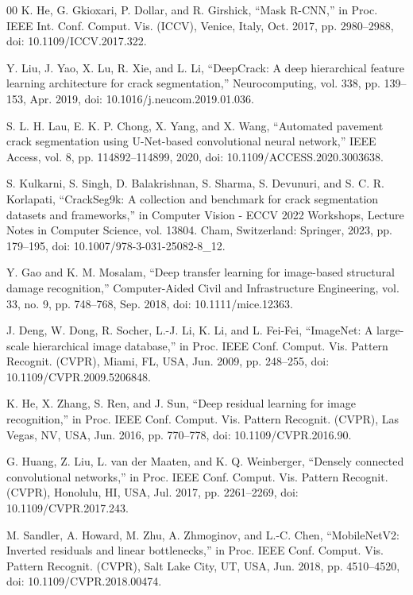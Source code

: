 \documentclass[conference]{IEEEtran}
\begin{document}
\begin{thebibliography}{00}
 K. He, G. Gkioxari, P. Dollar, and R. Girshick, ``Mask R-CNN,'' in Proc. IEEE Int. Conf. Comput. Vis. (ICCV), Venice, Italy, Oct. 2017, pp. 2980--2988, doi: 10.1109/ICCV.2017.322.

 Y. Liu, J. Yao, X. Lu, R. Xie, and L. Li, ``DeepCrack: A deep hierarchical feature learning architecture for crack segmentation,'' Neurocomputing, vol. 338, pp. 139--153, Apr. 2019, doi: 10.1016/j.neucom.2019.01.036.

 S. L. H. Lau, E. K. P. Chong, X. Yang, and X. Wang, ``Automated pavement crack segmentation using U-Net-based convolutional neural network,'' IEEE Access, vol. 8, pp. 114892--114899, 2020, doi: 10.1109/ACCESS.2020.3003638.

 S. Kulkarni, S. Singh, D. Balakrishnan, S. Sharma, S. Devunuri, and S. C. R. Korlapati, ``CrackSeg9k: A collection and benchmark for crack segmentation datasets and frameworks,'' in Computer Vision - ECCV 2022 Workshops, Lecture Notes in Computer Science, vol. 13804. Cham, Switzerland: Springer, 2023, pp. 179--195, doi: 10.1007/978-3-031-25082-8_12.

 Y. Gao and K. M. Mosalam, ``Deep transfer learning for image-based structural damage recognition,'' Computer-Aided Civil and Infrastructure Engineering, vol. 33, no. 9, pp. 748--768, Sep. 2018, doi: 10.1111/mice.12363.

 J. Deng, W. Dong, R. Socher, L.-J. Li, K. Li, and L. Fei-Fei, ``ImageNet: A large-scale hierarchical image database,'' in Proc. IEEE Conf. Comput. Vis. Pattern Recognit. (CVPR), Miami, FL, USA, Jun. 2009, pp. 248--255, doi: 10.1109/CVPR.2009.5206848.

 K. He, X. Zhang, S. Ren, and J. Sun, ``Deep residual learning for image recognition,'' in Proc. IEEE Conf. Comput. Vis. Pattern Recognit. (CVPR), Las Vegas, NV, USA, Jun. 2016, pp. 770--778, doi: 10.1109/CVPR.2016.90.

 G. Huang, Z. Liu, L. van der Maaten, and K. Q. Weinberger, ``Densely connected convolutional networks,'' in Proc. IEEE Conf. Comput. Vis. Pattern Recognit. (CVPR), Honolulu, HI, USA, Jul. 2017, pp. 2261--2269, doi: 10.1109/CVPR.2017.243.

 M. Sandler, A. Howard, M. Zhu, A. Zhmoginov, and L.-C. Chen, ``MobileNetV2: Inverted residuals and linear bottlenecks,'' in Proc. IEEE Conf. Comput. Vis. Pattern Recognit. (CVPR), Salt Lake City, UT, USA, Jun. 2018, pp. 4510--4520, doi: 10.1109/CVPR.2018.00474.


\end{thebibliography}
\end{document}
